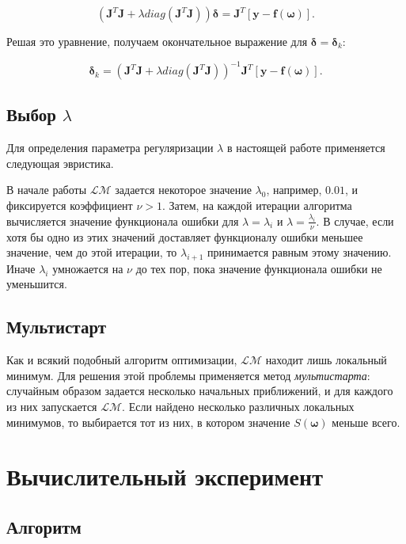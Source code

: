 \documentclass[12pt,a4paper]{amsart}
\begin{document}
\[
(\mathbf{J}^T\mathbf{J} + \lambda diag (\mathbf{J}^T\mathbf{J}))\boldsymbol{\delta} = \mathbf{J}^T [\mathbf{y - f(\boldsymbol{\omega})}].
\]

Решая это уравнение, получаем окончательное выражение для
$\boldsymbol{\delta} = \boldsymbol{\delta}_k$:

\[
\boldsymbol{\delta}_k = (\mathbf{J}^T\mathbf{J} + \lambda diag (\mathbf{J}^T\mathbf{J}))^{-1} \mathbf{J}^T [\mathbf{y - f(\boldsymbol{\omega})}].
\]

\subsection{Выбор $\lambda$}

Для определения параметра регуляризации $\lambda$ в настоящей работе
применяется следующая эвристика.

В начале работы $\mathcal{LM}$ задается некоторое значение $\lambda_0$,
например, $0.01$, и фиксируется коэффициент $\nu > 1$. Затем, на каждой
итерации алгоритма вычисляется значение функционала ошибки для
$\lambda = \lambda_i$ и $\lambda = \frac{\lambda_i}{\nu}$. В случае,
если хотя бы одно из этих значений доставляет функционалу ошибки
меньшее значение, чем до этой итерации, то $\lambda_{i+1}$ принимается
равным этому значению. Иначе $\lambda_i$ умножается на $\nu$ до тех
пор, пока значение функционала ошибки не уменьшится.

\subsection{Мультистарт}

Как и всякий подобный алгоритм оптимизации, $\mathcal{LM}$ находит лишь
локальный минимум. Для решения этой проблемы применяется метод \emph{мультистарта}:
случайным образом задается несколько начальных приближений, и для каждого из
них запускается $\mathcal{LM}$. Если найдено несколько различных локальных
минимумов, то выбирается тот из них, в котором значение $S(\boldsymbol{\omega})$
меньше всего.

\section{Вычислительный эксперимент}

\subsection{Алгоритм}
\end{document}
